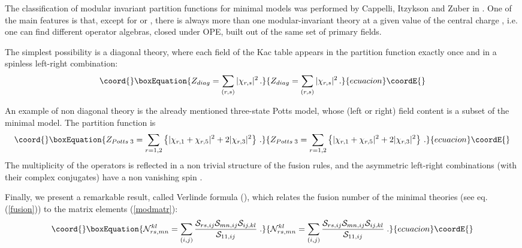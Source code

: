 \documentclass[a4paper,12pt]{report}
\begin{document}
The classification of modular invariant partition functions for minimal models was performed by Cappelli,
Itzykson and Zuber in \cite{ciz}. One of the main features is that, except for \coordHE{} or \coordHE{}, there is always
more than one modular-invariant theory at a given value of the central charge \coordHE{}, i.e. one
can find different operator algebras, closed under OPE, built out of the same set of primary fields.

The simplest possibility is a diagonal theory, where each field of the Kac table appears in the partition
function exactly once and in a spinless left-right combination:
\begin{equation}\coord{}\boxEquation{
Z_{diag}=\sum_{(r,s)}|\chi _{r,s }|^{2}\,.
}{
Z_{diag}=\sum_{(r,s)}|\chi _{r,s }|^{2}\,.
}{ecuacion}\coordE{}\end{equation}

An example of non diagonal theory is the already mentioned three-state Potts model, whose (left or right) field
content is a subset of the \coordHE{} minimal model. The partition function is
\begin{equation}\coord{}\boxEquation{
Z_{Potts\;3}=\sum_{r=1,2}\left\{|\chi _{r,1}+\chi _{r,5}|^{2}+2|\chi _{r,3}|^{2}\right\}\,.
}{
Z_{Potts\;3}=\sum_{r=1,2}\left\{|\chi _{r,1}+\chi _{r,5}|^{2}+2|\chi _{r,3}|^{2}\right\}\,.
}{ecuacion}\coordE{}\end{equation}
The multiplicity \coordHE{} of the operators \coordHE{} is reflected in a non trivial structure of the fusion rules,
and the asymmetric left-right combinations \coordHE{} (with their complex conjugates)
have a non vanishing spin \coordHE{}.

Finally, we present a remarkable result, called Verlinde formula (\cite{verl}), which relates the fusion number
\coordHE{} of the minimal theories (see eq.(\ref{fusion})) to the \coordHE{} matrix elements
(\ref{modmatr}):
\begin{equation}\coord{}\boxEquation{\label{verlform}
{\cal N}_{rs,mn}^{kl}=\sum_{(i,j)}\frac{{\cal S}_{rs,ij}{\cal S}_{mn,ij}{\cal S}_{ij,kl}}{{\cal S}_{11,ij}}\;.
}{{\cal N}_{rs,mn}^{kl}=\sum_{(i,j)}\frac{{\cal S}_{rs,ij}{\cal S}_{mn,ij}{\cal S}_{ij,kl}}{{\cal S}_{11,ij}}\;.
}{ecuacion}\coordE{}\end{equation}
\end{document}

